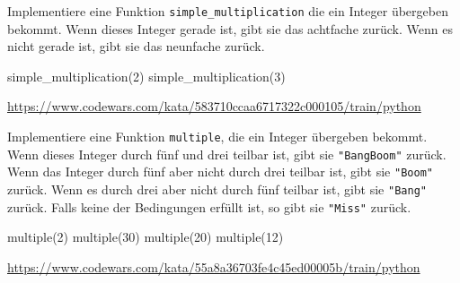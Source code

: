 \documentclass[class=scrartcl, crop=false]{standalone}
\begin{document}
	
\begin{aufgabe} \noindent
Implementiere eine Funktion \texttt{simple_multiplication} die ein Integer übergeben bekommt.
Wenn dieses Integer gerade ist, gibt sie das achtfache zurück. Wenn es nicht gerade ist, gibt sie das neunfache zurück.
	
\begin{pyconsole}
simple_multiplication(2)
simple_multiplication(3)
\end{pyconsole}
	
\noindent\url{https://www.codewars.com/kata/583710ccaa6717322c000105/train/python}
	
\end{aufgabe}	
	
	
	

\begin{aufgabe} \noindent
Implementiere eine Funktion \texttt{multiple}, die ein Integer übergeben bekommt.
Wenn dieses Integer durch fünf und drei teilbar ist, gibt sie \texttt{"BangBoom"} zurück. 
Wenn das Integer durch fünf aber nicht durch drei teilbar ist, gibt sie \texttt{"Boom"} zurück.  Wenn es durch drei aber nicht durch fünf teilbar ist, gibt sie \texttt{"Bang"} zurück. Falls keine der Bedingungen erfüllt ist, so gibt sie   \texttt{"Miss"} zurück.
	
\begin{pyconsole}
multiple(2)
multiple(30)
multiple(20)
multiple(12)
\end{pyconsole}
	
\noindent\url{https://www.codewars.com/kata/55a8a36703fe4c45ed00005b/train/python}
	
\end{aufgabe}
\end{document}
